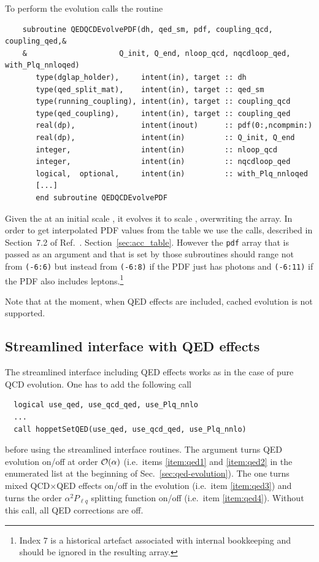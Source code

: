 To perform the evolution  calls the routine 
\begin{lstlisting}
    subroutine QEDQCDEvolvePDF(dh, qed_sm, pdf, coupling_qcd, coupling_qed,&
    &                     Q_init, Q_end, nloop_qcd, nqcdloop_qed, with_Plq_nnloqed)
       type(dglap_holder),     intent(in), target :: dh
       type(qed_split_mat),    intent(in), target :: qed_sm
       type(running_coupling), intent(in), target :: coupling_qcd
       type(qed_coupling),     intent(in), target :: coupling_qed
       real(dp),               intent(inout)      :: pdf(0:,ncompmin:)
       real(dp),               intent(in)         :: Q_init, Q_end
       integer,                intent(in)         :: nloop_qcd
       integer,                intent(in)         :: nqcdloop_qed
       logical,  optional,     intent(in)         :: with_Plq_nnloqed
       [...]
       end subroutine QEDQCDEvolvePDF
\end{lstlisting}
Given the  at an initial scale , it
evolves it to scale , overwriting the  array. 
%
In order to get interpolated PDF values from the table we use the
 calls, described in
\ifreleasenote
Section~7.2 of Ref.~\cite{Salam:2008qg}.
\else
Section~\ref{sec:acc_table}.
\fi
%
However the \texttt{pdf} array that is passed as an argument and that
is set by those subroutines should range not from \texttt{(-6:6)} but
instead from \texttt{(-6:8)} if the PDF just has photons and
\texttt{(-6:11)} if the PDF also includes leptons.\footnote{Index $7$
is a historical artefact associated with internal \hoppet bookkeeping
and should be ignored in the resulting  array.}

Note that at the moment, when QED effects are included, cached
evolution is not supported.


\subsection{Streamlined interface with QED effects}
\label{sec:qed-streamlined}
The streamlined interface including QED effects works as in the case of pure QCD evolution.
One has to add the following call
\begin{lstlisting}
  logical use_qed, use_qcd_qed, use_Plq_nnlo
  ...
  call hoppetSetQED(use_qed, use_qcd_qed, use_Plq_nnlo)
\end{lstlisting}
before using the streamlined interface routines.
%
The  argument turns QED evolution on/off at order
${\cal O}(\alpha)$ (i.e.\ items \ref{item:qed1} and \ref{item:qed2} in
the enumerated list at the beginning of
Sec.~\ref{sec:qed-evolution}).
%
The  one turns
mixed QCD$\times$QED effects on/off in the evolution (i.e.\ item \ref{item:qed3}) and  turns 
the order $\alpha^2 P_{\ell q}$ splitting function on/off (i.e.\
item \ref{item:qed4}).
%
Without this call, all QED corrections
are off.

